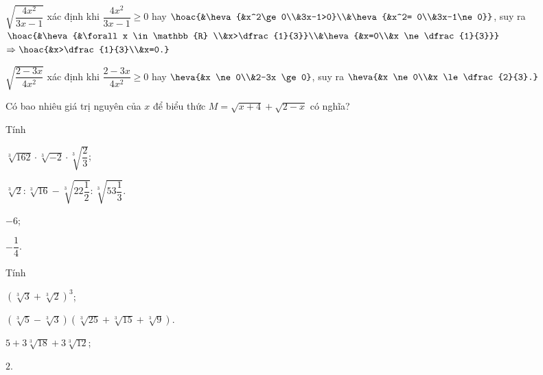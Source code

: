 \begin{bt}
{\begin{listEX}
	\item $\sqrt{\dfrac{4x^2}{3x-1}}$ xác định khi 
	$\dfrac{4x^2}{3x-1} \ge 0$ hay $\hoac{&\heva{&x^2\ge 0\\&3x-1>0}\\&\heva{&x^2= 0\\&3x-1\ne 0}}$, suy ra $\hoac{&\heva{&\forall x \in \mathbb{R} \\&x>\dfrac{1}{3}}\\&\heva{&x=0\\&x \ne \dfrac{1}{3}}}$
	 $\Rightarrow \hoac{&x>\dfrac{1}{3}\\&x=0.}$
	\item $\sqrt{\dfrac{2-3x}{4x^2}}$ xác định khi 
	$\dfrac{2-3x}{4x^2}\ge 0$ hay $\heva{&x \ne 0\\&2-3x \ge 0}$, suy ra $\heva{&x \ne 0\\&x \le \dfrac{2}{3}.}$
	\end{listEX}
	}
\end{bt}

\begin{bt}
	Có bao nhiêu giá trị nguyên của $x$ để biểu thức $M=\sqrt{x+4}+\sqrt{2-x}$ có nghĩa?
\end{bt}

\begin{bt}%
	Tính 
	\begin{listEX}[2]
	\item $\sqrt[3]{162}\cdot\sqrt[3]{ - 2}\cdot\sqrt[3]{\dfrac{2}{3}}$;
	\item $\sqrt[3]{2}:\sqrt[3]{16} - \sqrt[3]{22\dfrac{1}{2}}:\sqrt[3]{53\dfrac{1}{3}}$.
	\end{listEX}
	\loigiai
	{
	\begin{listEX}[2]
	\item $-6$;
	\item $-\dfrac{1}{4}$.
	\end{listEX}
	}
\end{bt}

\begin{bt}%
	Tính 
	\begin{listEX}[2]
	\item $\left(\sqrt[3]{3} + \sqrt[3]{2}\right)^3$;
	\item $\left(\sqrt[3]{5} - \sqrt[3]{3}\right)\left(\sqrt[3]{25} + \sqrt[3]{15} + \sqrt[3]{9}\right)$.
	\end{listEX}
	\loigiai
	{
	\begin{listEX}[2]
	\item $5 + 3\sqrt[3]{18} + 3\sqrt[3]{12}$; 
	\item $2.$
	\end{listEX}
	}
\end{bt}

